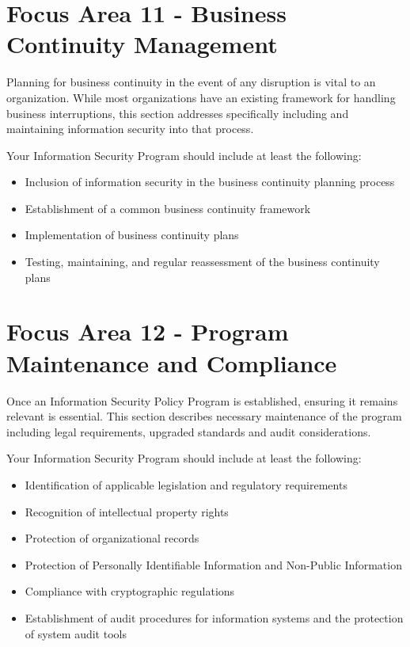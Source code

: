 \documentclass{needs}
\begin{document}
			
			\fTenTable
		
		\section{Focus Area 11 - Business Continuity Management}
		
			Planning for business continuity in the event of any disruption is vital to an organization.  While most organizations have an existing framework for handling business interruptions, this section addresses specifically including and maintaining information security into that process.
			
			Your Information Security Program should include at least the following: 
			\begin{itemize}
				\item Inclusion of information security in the business continuity planning process
				\item Establishment of a common business continuity framework
				\item Implementation of business continuity plans
				\item Testing, maintaining, and regular reassessment of the business continuity plans
			\end{itemize}			

			
			\fElevenTable
			
		\section{Focus Area 12 - Program Maintenance and Compliance}
		
			Once an Information Security Policy Program is established, ensuring it remains relevant is essential.  This section describes necessary maintenance of the program including legal requirements, upgraded standards and audit considerations.

			Your Information Security Program should include at least the following: 
			\begin{itemize}
				\item Identification of applicable legislation and regulatory requirements
				\item Recognition of intellectual property rights
				\item Protection of organizational records
				\item Protection of Personally Identifiable Information and Non-Public Information
				\item Compliance with cryptographic regulations
				\item Establishment of audit procedures for information systems and the protection of system audit tools
			\end{itemize}
\end{document}
